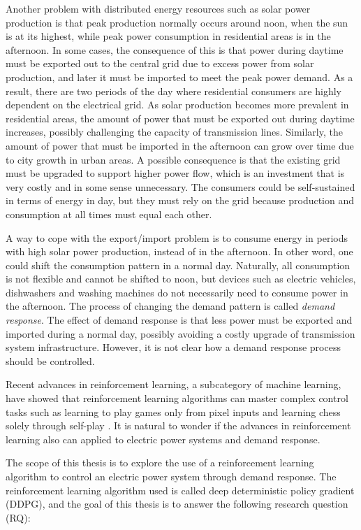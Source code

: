 \documentclass[class=book, crop=false, 11pt]{standalone}
\begin{document}
Another problem with distributed energy resources such as solar power production is that peak production normally occurs around noon, when the sun is at its highest, while peak power consumption in residential areas is in the afternoon. In some cases, the consequence of this is that power during daytime must be exported out to the central grid due to excess power from solar production, and later it must be imported to meet the peak power demand. As a result, there are two periods of the day where residential consumers are highly dependent on the electrical grid. As solar production becomes more prevalent in residential areas, the amount of power that must be exported out during daytime increases, possibly challenging the capacity of transmission lines. Similarly, the amount of power that must be imported in the afternoon can grow over time due to city growth in urban areas. A possible consequence is that the existing grid must be upgraded to support higher power flow, which is an investment that is very costly and in some sense unnecessary. The consumers could be self-sustained in terms of energy in day, but they must rely on the grid because production and consumption at all times must equal each other.

A way to cope with the export/import problem is to consume energy in periods with high solar power production, instead of in the afternoon. In other word, one could shift the consumption pattern in a normal day. Naturally, all consumption is not flexible and cannot be shifted to noon, but devices such as electric vehicles, dishwashers and washing machines do not necessarily need to consume power in the afternoon. The process of changing the demand pattern is called \textit{demand response}. The effect of demand response is that less power must be exported and imported during a normal day, possibly avoiding a costly upgrade of transmission system infrastructure. However, it is not clear how a demand response process should be controlled. 

Recent advances in reinforcement learning, a subcategory of machine learning, have showed that  reinforcement learning algorithms can master complex control tasks such as learning to play games only from pixel inputs and learning chess solely through self-play \cite{DQN_Mnih_et_al_2013}\cite{alphazero}. It is natural to wonder if the advances in reinforcement learning also can applied to electric power systems and demand response.

The scope of this thesis is to explore the use of a reinforcement learning algorithm to control an electric power system through demand response. The reinforcement learning algorithm used is called deep deterministic policy gradient (DDPG), and the goal of this thesis is to answer the following research question (RQ):
\end{document}
